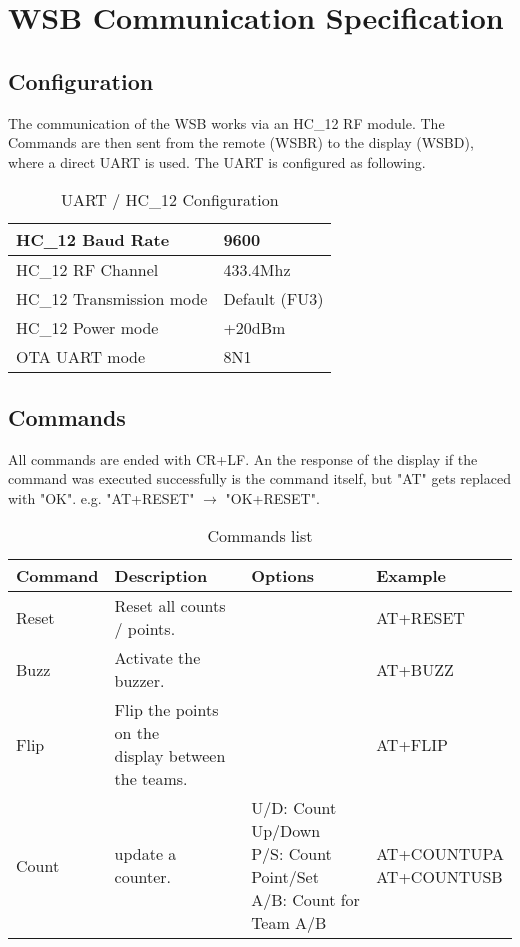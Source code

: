 \chapter*{WSB Communication Specification}


\section*{Configuration}

The communication of the WSB works via an HC\_12 RF module. The Commands are then sent from the remote (WSBR) to the display (WSBD), where a direct UART is used. The UART is configured as following.

\begin{table}[H]
    \centering
\begin{tabular}{||p{6cm} | p{4cm} ||} 
 \hline
     HC\_12 Baud Rate & 9600 \\ 
 \hline
     HC\_12 RF Channel & 433.4Mhz \\ 
 \hline
     HC\_12 Transmission mode & Default (FU3) \\ 
 \hline
     HC\_12 Power mode & +20dBm \\ 
 \hline
     OTA UART mode & 8N1 \\ 
 \hline
\end{tabular}
    \caption{UART / HC\_12 Configuration}
\end{table}

\section*{Commands}

All commands are ended with CR+LF. An the response of the display if the command was executed successfully is the command itself, but "AT" gets replaced with "OK". e.g. "AT+RESET" $\rightarrow$ "OK+RESET".

\begin{table}[H]
    \centering
\begin{tabular}{||p{2cm} | p{4.5cm} | p{5cm} | p{3.5cm} ||} 
 \hline
 Command & Description & Options & Example \\ [0.5ex] 
 \hline\hline
     Reset & Reset all counts / points. &  & AT+RESET \\ 
 \hline
     Buzz & Activate the buzzer. &  & AT+BUZZ \\ 
 \hline
     Flip & \makecell[lt]{Flip the points on the \\ display between \\ the teams.} &  & AT+FLIP \\ 
 \hline
     Count & update a counter. & \makecell[lt]{U/D: Count Up/Down \\ P/S: Count Point/Set \\ A/B: Count for Team A/B} & \makecell[lt]{AT+COUNTUPA \\ AT+COUNTUSB} \\ 
 \hline
\end{tabular}
    \caption{Commands list}
\end{table}